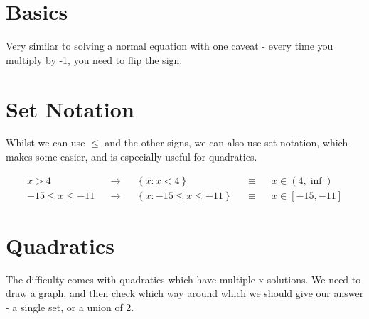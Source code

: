 \section{Basics}
Very similar to solving a normal equation with one caveat - every time you multiply by -1, you need to flip the sign.



\section{Set Notation}
Whilst we can use \(\le\) and the other signs, we can also use set notation, which makes some easier, and is especially useful for quadratics.

\begin{align*}
	x > 4 &&\to&& \left\lbrace x: x < 4 \right\rbrace  &&\equiv&& x \in (4, \inf) \\
	-15 \leq x \leq -11 &&\to&& \left\lbrace x: -15 \leq x \leq -11 \right\rbrace  &&\equiv&& x \in [-15, -11]
\end{align*}

\section{Quadratics}
The difficulty comes with quadratics which have multiple x-solutions. We need to draw a graph, and then check which way around which we should give our answer - a single set, or a union of 2.

